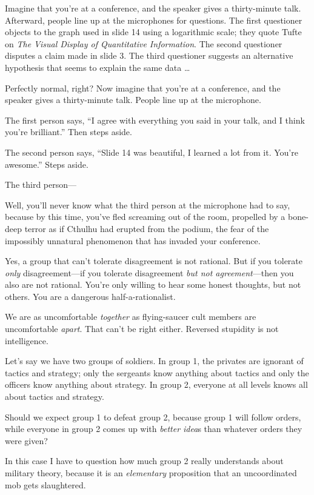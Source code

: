 {
 Imagine that you're at a conference, and the
speaker gives a thirty-minute talk. Afterward, people line up at the
microphones for questions. The first questioner objects to the graph
used in slide 14 using a logarithmic scale; they quote Tufte on
\textit{The Visual Display of Quantitative Information}. The second
questioner disputes a claim made in slide 3. The third questioner
suggests an alternative hypothesis that seems to explain the same data
\ldots}

{
 Perfectly normal, right? Now imagine that you're
at a conference, and the speaker gives a thirty-minute talk. People
line up at the microphone.}

{
 The first person says, ``I agree with everything
you said in your talk, and I think you're
brilliant.'' Then steps aside.}

{
 The second person says, ``Slide 14 was beautiful,
I learned a lot from it. You're
awesome.'' Steps aside.}

{
 The third person---}

{
 Well, you'll never know what the third person at
the microphone had to say, because by this time, you've
fled screaming out of the room, propelled by a bone-deep terror as if
Cthulhu had erupted from the podium, the fear of the impossibly
unnatural phenomenon that has invaded your conference.}

{
 Yes, a group that can't tolerate disagreement is
not rational. But if you tolerate \textit{only} disagreement---if you
tolerate disagreement \textit{but not agreement}{}---then you also are
not rational. You're only willing to hear some honest
thoughts, but not others. You are a dangerous half-a-rationalist.}

{
 We are as uncomfortable \textit{together} as flying-saucer cult
members are uncomfortable \textit{apart}. That can't be
right either. Reversed stupidity is not intelligence.}

{
 Let's say we have two groups of soldiers. In group
1, the privates are ignorant of tactics and strategy; only the
sergeants know anything about tactics and only the officers know
anything about strategy. In group 2, everyone at all levels knows all
about tactics and strategy.}

{
 Should we expect group 1 to defeat group 2, because group 1 will
follow orders, while everyone in group 2 comes up with \textit{better
idea}s than whatever orders they were given?}

{
 In this case I have to question how much group 2 really
understands about military theory, because it is an \textit{elementary}
proposition that an uncoordinated mob gets slaughtered.}

